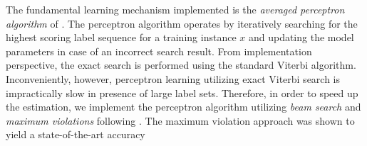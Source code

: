 \documentclass[smallextended]{svjour3}       %
\begin{document}
The fundamental learning mechanism implemented is the 
\emph{averaged perceptron algorithm} of \citet{collins2002}. %
The perceptron algorithm operates by iteratively searching for the highest scoring label sequence for a training instance $x$ and updating the model parameters in case of an incorrect search result. From implementation perspective, the exact search is performed using the standard Viterbi algorithm. 
Inconveniently, however, perceptron learning utilizing exact Viterbi search is impractically slow in presence of large label sets. Therefore, in order to speed up the estimation, we implement the perceptron algorithm utilizing \emph{beam search} and \emph{maximum violations} following \citet{huang2012}.  The maximum violation approach was shown to yield a state-of-the-art accuracy
\end{document}

